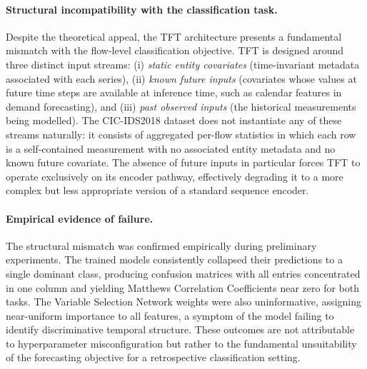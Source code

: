 \documentclass[../main.tex]{subfiles}
\begin{document}
\paragraph{Structural incompatibility with the classification task.}
Despite the theoretical appeal, the TFT architecture presents a fundamental mismatch with the flow-level classification objective.  TFT is designed around three distinct input streams: (i) \emph{static entity covariates} (time-invariant metadata associated with each series), (ii) \emph{known future inputs} (covariates whose values at future time steps are available at inference time, such as calendar features in demand forecasting), and (iii) \emph{past observed inputs} (the historical measurements being modelled).  The CIC-IDS2018 dataset does not instantiate any of these streams naturally: it consists of aggregated per-flow statistics in which each row is a self-contained measurement with no associated entity metadata and no known future covariate.  The absence of future inputs in particular forces TFT to operate exclusively on its encoder pathway, effectively degrading it to a more complex but less appropriate version of a standard sequence encoder.

\paragraph{Empirical evidence of failure.}
The structural mismatch was confirmed empirically during preliminary experiments.  The trained models consistently collapsed their predictions to a single dominant class, producing confusion matrices with all entries concentrated in one column and yielding Matthews Correlation Coefficients near zero for both tasks.  The Variable Selection Network weights were also uninformative, assigning near-uniform importance to all features, a symptom of the model failing to identify discriminative temporal structure.  These outcomes are not attributable to hyperparameter misconfiguration but rather to the fundamental unsuitability of the forecasting objective for a retrospective classification setting.
\end{document}
